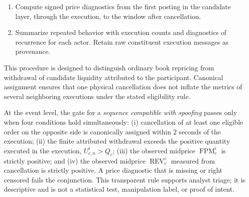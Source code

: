 \documentclass[11pt]{article}
\newenvironment{review}{\begingroup\color{blue}}{\endgroup}
\begin{document}
\begin{enumerate}
    to order \begin{review}candidate events\end{review} for human review without applying it as \begin{review}a threshold for the strict gate\end{review}.
    \item Compute signed price diagnostics from \begin{review}the first posting in the candidate layer\end{review}, through the execution, to \begin{review}the window after cancellation\end{review}.
    \item Summarize repeated behavior with execution counts and \begin{review}diagnostics of recurrence for each actor\end{review}. Retain \begin{review}raw constituent execution messages\end{review} as provenance.
\end{enumerate}
This procedure is designed to distinguish ordinary book repricing from withdrawal of \begin{review}candidate liquidity attributed to the participant\end{review}. Canonical assignment ensures that one physical cancellation does not inflate the metrics of several neighboring
executions under the stated eligibility rule.

\begin{review}At the event level, the gate for a \textit{sequence compatible with spoofing}\end{review} passes only when four conditions hold simultaneously:
(i) \begin{review}cancellation of at least one eligible order on the opposite side\end{review} is canonically assigned within $2$ seconds of the execution;
(ii) the finite attributed withdrawal exceeds \begin{review}the positive quantity executed in the execution\end{review},
$U^{i}_{c,n}>Q_c$; (iii) the observed midprice $\operatorname{FPM}^{i}_{c}$ is strictly positive; and (iv) \begin{review}the observed midprice $\operatorname{REV}^{i}_{c}$ measured from cancellation\end{review} is strictly positive. \begin{review}A price diagnostic that is missing or right censored\end{review}
fails the conjunction. This transparent rule supports analyst triage; it is descriptive and is not a statistical test,
manipulation label, or proof of intent.
\end{document}
